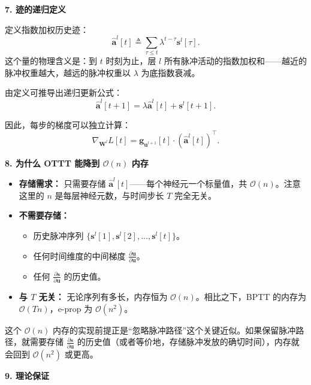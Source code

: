 \documentclass[journal,12pt,onecolumn]{IEEEtran}
\begin{document}
\medskip\noindent\textbf{7. 迹的递归定义}

定义指数加权历史迹：
\begin{equation}
    \hat{\mathbf{a}}^l[t] \triangleq \sum_{\tau \le t} \lambda^{t-\tau} \mathbf{s}^l[\tau]. \tag{8}
\end{equation}
这个量的物理含义是：到 $t$ 时刻为止，层 $l$ 所有脉冲活动的指数加权和——越近的脉冲权重越大，越远的脉冲权重以 $\lambda$ 为底指数衰减。

由定义可推导出递归更新公式：
\begin{equation}
    \hat{\mathbf{a}}^l[t+1] = \lambda \hat{\mathbf{a}}^l[t] + \mathbf{s}^l[t+1]. \tag{9}
\end{equation}

因此，每步的梯度可以独立计算：
\begin{equation}
    \boxed{\nabla_{\mathbf{W}^l} L[t] = \mathbf{g}_{\mathbf{u}^{l+1}}[t] \cdot (\hat{\mathbf{a}}^l[t])^\top}. \tag{10}
\end{equation}

\medskip\noindent\textbf{8. 为什么 OTTT 能降到 $\mathcal{O}(n)$ 内存}

\begin{itemize}
    \item \textbf{存储需求：} 只需要存储 $\hat{\mathbf{a}}^l[t]$——每个神经元一个标量值，共 $\mathcal{O}(n)$。注意这里的 $n$ 是每层神经元数，与时间步长 $T$ 完全无关。
    \item \textbf{不需要存储：}
        \begin{itemize}
            \item 历史脉冲序列 $\{\mathbf{s}^l[1], \mathbf{s}^l[2], \dots, \mathbf{s}^l[t]\}$。
            \item 任何时间维度的中间梯度 $\frac{\partial \mathbf{u}}{\partial \mathbf{u}}$。
            \item 任何 $\frac{\partial \mathbf{s}}{\partial \mathbf{u}}$ 的历史值。
        \end{itemize}
    \item \textbf{与 $T$ 无关：} 无论序列有多长，内存恒为 $\mathcal{O}(n)$。相比之下，BPTT 的内存为 $\mathcal{O}(Tn)$，e-prop 为 $\mathcal{O}(n^2)$。
\end{itemize}

这个 $\mathcal{O}(n)$ 内存的实现前提正是“忽略脉冲路径”这个关键近似。如果保留脉冲路径，就需要存储 $\frac{\partial \mathbf{s}}{\partial \mathbf{u}}$ 的历史值（或者等价地，存储脉冲发放的确切时间），内存就会回到 $\mathcal{O}(n^2)$ 或更高。

\medskip\noindent\textbf{9. 理论保证}
\end{document}
